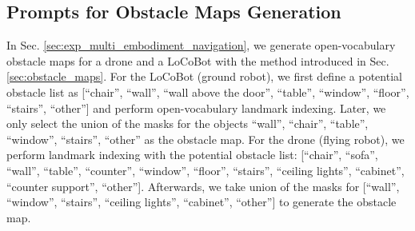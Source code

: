 \documentclass[letterpaper, 10 pt, conference]{ieeeconf}  %
\begin{document}
\subsection{Prompts for Obstacle Maps Generation}\label{sec:prompt_obs_map}
In Sec. \ref{sec:exp_multi_embodiment_navigation}, we generate open-vocabulary obstacle maps for a drone and a LoCoBot with the method introduced in Sec. \ref{sec:obstacle_maps}. For the LoCoBot (ground robot), we first define a potential obstacle list as [``chair'', ``wall'', ``wall above the door'', ``table'', ``window'', ``floor'', ``stairs'', ``other''] and perform open-vocabulary landmark indexing. Later, we only select the union of the masks for the objects ``wall'', ``chair'', ``table'', ``window'', ``stairs'', ``other'' as the obstacle map. For the drone (flying robot), we perform landmark indexing with the potential obstacle list: [``chair'', ``sofa'', ``wall'', ``table'', ``counter'', ``window'', ``floor'', ``stairs'', ``ceiling lights'', ``cabinet'', ``counter support'', ``other'']. Afterwards, we take union of the masks for [``wall'', ``window'', ``stairs'', ``ceiling lights'', ``cabinet'', ``other''] to generate the obstacle map.
\end{document}
